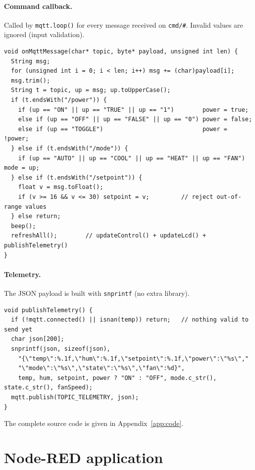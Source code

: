 \documentclass[11pt,a4paper]{article}
\newcommand{\topic}[1]{\texttt{\small #1}}
\begin{document}
\paragraph{Command callback.} Called by \texttt{mqtt.loop()} for every message received on
\topic{cmd/\#}. Invalid values are ignored (input validation).
\begin{lstlisting}[style=cpp]
void onMqttMessage(char* topic, byte* payload, unsigned int len) {
  String msg;
  for (unsigned int i = 0; i < len; i++) msg += (char)payload[i];
  msg.trim();
  String t = topic, up = msg; up.toUpperCase();
  if (t.endsWith("/power")) {
    if (up == "ON" || up == "TRUE" || up == "1")        power = true;
    else if (up == "OFF" || up == "FALSE" || up == "0") power = false;
    else if (up == "TOGGLE")                            power = !power;
  } else if (t.endsWith("/mode")) {
    if (up == "AUTO" || up == "COOL" || up == "HEAT" || up == "FAN") mode = up;
  } else if (t.endsWith("/setpoint")) {
    float v = msg.toFloat();
    if (v >= 16 && v <= 30) setpoint = v;         // reject out-of-range values
  } else return;
  beep();
  refreshAll();        // updateControl() + updateLcd() + publishTelemetry()
}
\end{lstlisting}

\paragraph{Telemetry.} The JSON payload is built with \texttt{snprintf} (no extra library).
\begin{lstlisting}[style=cpp]
void publishTelemetry() {
  if (!mqtt.connected() || isnan(temp)) return;   // nothing valid to send yet
  char json[200];
  snprintf(json, sizeof(json),
    "{\"temp\":%.1f,\"hum\":%.1f,\"setpoint\":%.1f,\"power\":\"%s\","
    "\"mode\":\"%s\",\"state\":\"%s\",\"fan\":%d}",
    temp, hum, setpoint, power ? "ON" : "OFF", mode.c_str(), state.c_str(), fanSpeed);
  mqtt.publish(TOPIC_TELEMETRY, json);
}
\end{lstlisting}

The complete source code is given in Appendix~\ref{app:code}.

\section{Node-RED application}
\end{document}
